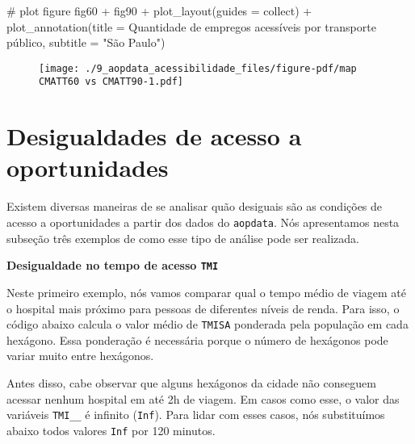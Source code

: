 \documentclass[
  letterpaper,
  DIV=11,
  numbers=noendperiod]{scrreprt}
\newenvironment{Shaded}{\begin{snugshade}}{\end{snugshade}}
\newcommand{\AttributeTok}[1]{\textcolor[rgb]{0.40,0.45,0.13}{#1}}
\newcommand{\CommentTok}[1]{\textcolor[rgb]{0.37,0.37,0.37}{#1}}
\newcommand{\FunctionTok}[1]{\textcolor[rgb]{0.28,0.35,0.67}{#1}}
\newcommand{\NormalTok}[1]{\textcolor[rgb]{0.00,0.23,0.31}{#1}}
\newcommand{\SpecialCharTok}[1]{\textcolor[rgb]{0.37,0.37,0.37}{#1}}
\newcommand{\StringTok}[1]{\textcolor[rgb]{0.13,0.47,0.30}{#1}}
\begin{document}
\begin{Shaded}
\begin{Highlighting}[]
\CommentTok{\# plot figure}
\NormalTok{fig60 }\SpecialCharTok{+}\NormalTok{ fig90 }\SpecialCharTok{+} 
  \FunctionTok{plot\_layout}\NormalTok{(}\AttributeTok{guides =} \StringTok{\textquotesingle{}collect\textquotesingle{}}\NormalTok{) }\SpecialCharTok{+}
  \FunctionTok{plot\_annotation}\NormalTok{(}\AttributeTok{title =} \StringTok{\textquotesingle{}Quantidade de empregos acessíveis por transporte público\textquotesingle{}}\NormalTok{,}
                  \AttributeTok{subtitle =} \StringTok{"São Paulo"}\NormalTok{)}
\end{Highlighting}
\end{Shaded}

\begin{figure}[H]

{\centering \texttt{[image: ./9\_aopdata\_acessibilidade\_files/figure-pdf/map CMATT60 vs CMATT90-1.pdf]}

}

\end{figure}

\hypertarget{desigualdades-de-acesso-a-oportunidades}{%
\section{Desigualdades de acesso a
oportunidades}\label{desigualdades-de-acesso-a-oportunidades}}

Existem diversas maneiras de se analisar quão desiguais são as condições
de acesso a oportunidades a partir dos dados do \texttt{aopdata}. Nós
apresentamos nesta subseção três exemplos de como esse tipo de análise
pode ser realizada.

\textbf{Desigualdade no tempo de acesso \texttt{TMI}}

Neste primeiro exemplo, nós vamos comparar qual o tempo médio de viagem
até o hospital mais próximo para pessoas de diferentes níveis de renda.
Para isso, o código abaixo calcula o valor médio de \texttt{TMISA}
ponderada pela população em cada hexágono. Essa ponderação é necessária
porque o número de hexágonos pode variar muito entre hexágonos.

Antes disso, cabe observar que alguns hexágonos da cidade não conseguem
acessar nenhum hospital em até 2h de viagem. Em casos como esse, o valor
das variáveis \texttt{TMI\_\_} é infinito (\texttt{Inf}). Para lidar com
esses casos, nós substituímos abaixo todos valores \texttt{Inf} por 120
minutos.
\end{document}

